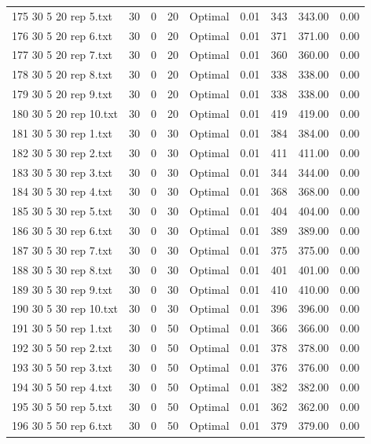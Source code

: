\begin{longtable}{lrrllrrrr}
175 30 5 20 rep 5.txt & 30 & 0 & 20 & Optimal &  0.01 & 343 & 343.00 &  0.00\\
176 30 5 20 rep 6.txt & 30 & 0 & 20 & Optimal &  0.01 & 371 & 371.00 &  0.00\\
177 30 5 20 rep 7.txt & 30 & 0 & 20 & Optimal &  0.01 & 360 & 360.00 &  0.00\\
178 30 5 20 rep 8.txt & 30 & 0 & 20 & Optimal &  0.01 & 338 & 338.00 &  0.00\\
179 30 5 20 rep 9.txt & 30 & 0 & 20 & Optimal &  0.01 & 338 & 338.00 &  0.00\\
180 30 5 20 rep 10.txt & 30 & 0 & 20 & Optimal &  0.01 & 419 & 419.00 &  0.00\\
181 30 5 30 rep 1.txt & 30 & 0 & 30 & Optimal &  0.01 & 384 & 384.00 &  0.00\\
182 30 5 30 rep 2.txt & 30 & 0 & 30 & Optimal &  0.01 & 411 & 411.00 &  0.00\\
183 30 5 30 rep 3.txt & 30 & 0 & 30 & Optimal &  0.01 & 344 & 344.00 &  0.00\\
184 30 5 30 rep 4.txt & 30 & 0 & 30 & Optimal &  0.01 & 368 & 368.00 &  0.00\\
185 30 5 30 rep 5.txt & 30 & 0 & 30 & Optimal &  0.01 & 404 & 404.00 &  0.00\\
186 30 5 30 rep 6.txt & 30 & 0 & 30 & Optimal &  0.01 & 389 & 389.00 &  0.00\\
187 30 5 30 rep 7.txt & 30 & 0 & 30 & Optimal &  0.01 & 375 & 375.00 &  0.00\\
188 30 5 30 rep 8.txt & 30 & 0 & 30 & Optimal &  0.01 & 401 & 401.00 &  0.00\\
189 30 5 30 rep 9.txt & 30 & 0 & 30 & Optimal &  0.01 & 410 & 410.00 &  0.00\\
190 30 5 30 rep 10.txt & 30 & 0 & 30 & Optimal &  0.01 & 396 & 396.00 &  0.00\\
191 30 5 50 rep 1.txt & 30 & 0 & 50 & Optimal &  0.01 & 366 & 366.00 &  0.00\\
192 30 5 50 rep 2.txt & 30 & 0 & 50 & Optimal &  0.01 & 378 & 378.00 &  0.00\\
193 30 5 50 rep 3.txt & 30 & 0 & 50 & Optimal &  0.01 & 376 & 376.00 &  0.00\\
194 30 5 50 rep 4.txt & 30 & 0 & 50 & Optimal &  0.01 & 382 & 382.00 &  0.00\\
195 30 5 50 rep 5.txt & 30 & 0 & 50 & Optimal &  0.01 & 362 & 362.00 &  0.00\\
196 30 5 50 rep 6.txt & 30 & 0 & 50 & Optimal &  0.01 & 379 & 379.00 &  0.00\\

\end{longtable}
